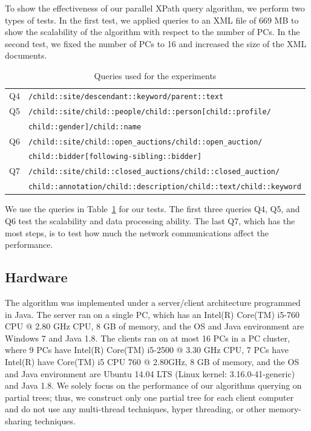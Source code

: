 To show the effectiveness of our parallel XPath query algorithm, we
perform two types of tests. In the first test, we applied queries to an XML file of 669 MB
to show the scalability of the algorithm with respect to the number of PCs.
In the second test, we fixed the number of PCs to 16 and increased the size of the XML documents.

\begin{table}[t]
	\caption{Queries used for the experiments}
	\label{table:queries}
	\centering
	\begin{tabular}{c|l}
		\hline
		Q4 & \texttt{/child::site/descendant::keyword/parent::text}\\
		Q5 & \texttt{/child::site/child::people/child::person[child::profile/} \\
		& \texttt{child::gender]/child::name}\\
		Q6 & \texttt{/child::site/child::open\_auctions/child::open\_auction/} \\
		& \texttt{child::bidder[following-sibling::bidder]}\\
		Q7 & \texttt{/child::site/child::closed\_auctions/child::closed\_auction/}\\
		   & \hfill\texttt{child::annotation/child::description/child::text/child::keyword}\\
		\hline
	\end{tabular}
\end{table}


We use the queries in Table~\ref{table:queries} for our tests.  The
first three queries Q4, Q5, and Q6 test the scalability and
data processing ability.  The last Q7, which has the most steps, is to
test how much the network communications affect the performance.


\subsection{Hardware}

The algorithm was implemented under a server/client architecture 
programmed in Java. The server ran on a single PC, 
which has an Intel(R) Core(TM) i5-760 CPU @ 2.80 GHz CPU, 8 GB of memory, 
and the OS and Java environment are Windows 7 and Java 1.8. 
The clients ran on at most 16 PCs in a PC cluster, where 
9 PCs have Intel(R) Core(TM) i5-2500 @ 3.30 GHz CPU, 7 PCs have Intel(R) have Core(TM) 
i5 CPU 760 @ 2.80GHz, 8 GB of memory, and the OS and Java environment are Ubuntu 14.04 LTS (Linux kernel: 3.16.0-41-generic) and Java 1.8.  
We solely focus on the performance of our algorithms querying on partial trees; 
thus, we construct only one partial tree for each client computer  
and do not use any multi-thread techniques, hyper threading, or other 
memory-sharing techniques. 



